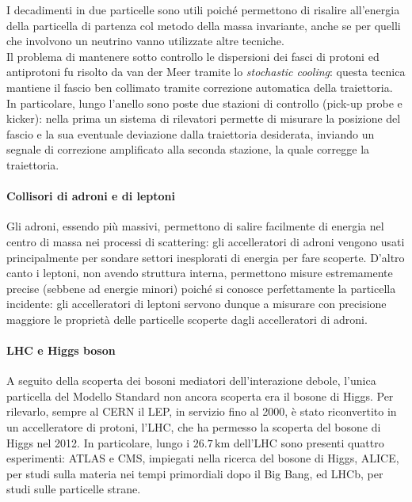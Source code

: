 I decadimenti in due particelle sono utili poiché permettono di risalire all'energia della particella di partenza col metodo della massa invariante, anche se per quelli che involvono un neutrino vanno utilizzate altre tecniche.\\
Il problema di mantenere sotto controllo le dispersioni dei fasci di protoni ed antiprotoni fu risolto da van der Meer tramite lo \textit{stochastic cooling}: questa tecnica mantiene il fascio ben collimato tramite correzione automatica della traiettoria. In particolare, lungo l'anello sono poste due stazioni di controllo (pick-up probe e kicker): nella prima un sistema di rilevatori permette di misurare la posizione del fascio e la sua eventuale deviazione dalla traiettoria desiderata, inviando un segnale di correzione amplificato alla seconda stazione, la quale corregge la traiettoria.

\paragraph{Collisori di adroni e di leptoni}

Gli adroni, essendo più massivi, permettono di salire facilmente di energia nel centro di massa nei processi di scattering: gli accelleratori di adroni vengono usati principalmente per sondare settori inesplorati di energia per fare scoperte. D'altro canto i leptoni, non avendo struttura interna, permettono misure estremamente precise (sebbene ad energie minori) poiché si conosce perfettamente la particella incidente: gli accelleratori di leptoni servono dunque a misurare con precisione maggiore le proprietà delle particelle scoperte dagli accelleratori di adroni.

\paragraph{LHC e Higgs boson}

A seguito della scoperta dei bosoni mediatori dell'interazione debole, l'unica particella del Modello Standard non ancora scoperta era il bosone di Higgs. Per rilevarlo, sempre al CERN il LEP, in servizio fino al 2000, è stato riconvertito in un accelleratore di protoni, l'LHC, che ha permesso la scoperta del bosone di Higgs nel 2012. In particolare, lungo i $ 26.7\,\text{km} $ dell'LHC sono presenti quattro esperimenti: ATLAS e CMS, impiegati nella ricerca del bosone di Higgs, ALICE, per studi sulla materia nei tempi primordiali dopo il Big Bang, ed LHCb, per studi sulle particelle strane.

